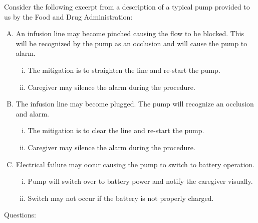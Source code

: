 \documentclass{article}
\begin{document}
\begin{enumerate}[\bf I.]
\begin{enumerate}[1.]
        Consider the following excerpt from a description of a typical pump provided to us by the Food and
        Drug Administration:

        \begin{enumerate}[A.]
            \item An infusion line may become pinched causing the flow to be blocked.  This will be recognized
            by the pump as an occlusion and will cause the pump to alarm.

            \begin{enumerate}[i.]
                \item The mitigation is to straighten the line and re-start the pump.
                \item Caregiver may silence the alarm during the procedure.
            \end{enumerate}

            \item The infusion line may become plugged.  The pump will recognize an occlusion and alarm.

            \begin{enumerate}[i.]
                \item The mitigation is to clear the line and re-start the pump.
                \item Caregiver may silence the alarm during the procedure.
            \end{enumerate}

            \item Electrical failure may occur causing the pump to switch to battery operation.

            \begin{enumerate}[i.]
                \item Pump will switch over to battery power and notify the caregiver visually.
                \item Switch may not occur if the battery is not properly charged.
            \end{enumerate}

        \end{enumerate}

        Questions:


\end{enumerate}
\end{enumerate}
\end{document}
